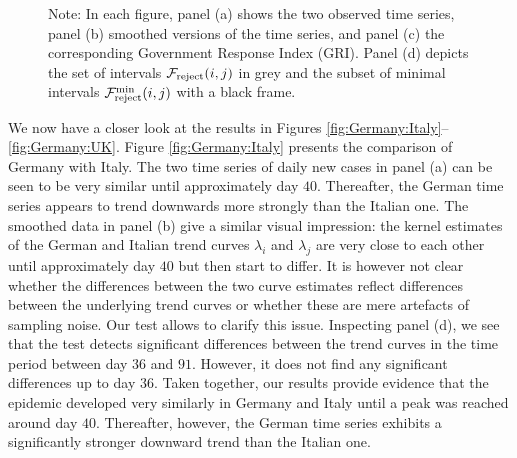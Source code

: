 \documentclass[a4paper,12pt]{article}
\numberwithin{equation}{section}
\begin{document}
\begin{figure}[p!]
\caption*{Note: In each figure, panel (a) shows the two observed time series, panel (b) smoothed versions of the time series, and panel (c) the corresponding Government Response Index (GRI). Panel (d) depicts the set of intervals $\mathcal{F}_{\text{reject}}(i,j)$ in grey and the subset of minimal intervals $\mathcal{F}_{\text{reject}}^{\text{min}}(i,j)$ with a black frame.}
\end{figure}


We now have a closer look at the results in Figures \ref{fig:Germany:Italy}--\ref{fig:Germany:UK}. Figure \ref{fig:Germany:Italy} presents the comparison of Germany with Italy. The two time series of daily new cases in panel (a) can be seen to be very similar until approximately day $40$. Thereafter, the German time series appears to trend downwards more strongly than the Italian one. The smoothed data in panel (b) give a similar visual impression: the kernel estimates of the German and Italian trend curves $\lambda_i$ and $\lambda_j$ are very close to each other until approximately day $40$ but then start to differ. It is however not clear whether the differences between the two curve estimates reflect differences between the underlying trend curves or whether these are mere artefacts of sampling noise. Our test allows to clarify this issue. Inspecting panel (d), we see that the test detects significant differences between the trend curves in the time period between day $36$ and $91$. However, it does not find any significant differences up to day $36$. 
Taken together, our results provide evidence that the epidemic developed very similarly in Germany and Italy until a peak was reached around day $40$. Thereafter, however, the German time series exhibits a significantly stronger downward trend than the Italian one. 

\end{document}
